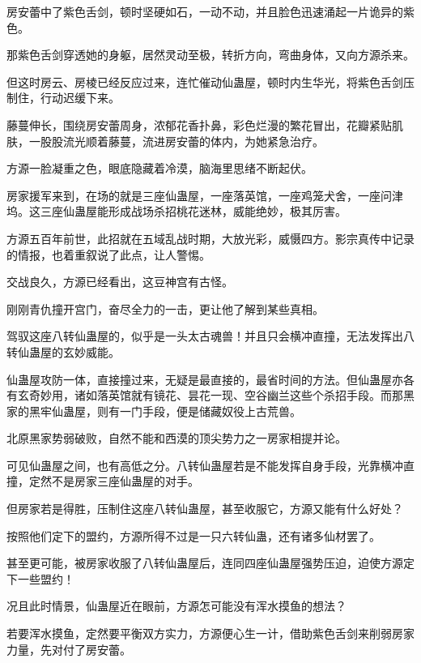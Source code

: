
\begin{this_body}



房安蕾中了紫色舌剑，顿时坚硬如石，一动不动，并且脸色迅速涌起一片诡异的紫色。

那紫色舌剑穿透她的身躯，居然灵动至极，转折方向，弯曲身体，又向方源杀来。

但这时房云、房棱已经反应过来，连忙催动仙蛊屋，顿时内生华光，将紫色舌剑压制住，行动迟缓下来。

藤蔓伸长，围绕房安蕾周身，浓郁花香扑鼻，彩色烂漫的繁花冒出，花瓣紧贴肌肤，一股股流光顺着藤蔓，流进房安蕾的体内，为她紧急治疗。

方源一脸凝重之色，眼底隐藏着冷漠，脑海里思绪不断起伏。

房家援军来到，在场的就是三座仙蛊屋，一座落英馆，一座鸡笼犬舍，一座问津坞。这三座仙蛊屋能形成战场杀招桃花迷林，威能绝妙，极其厉害。

方源五百年前世，此招就在五域乱战时期，大放光彩，威慑四方。影宗真传中记录的情报，也着重叙说了此点，让人警惕。

交战良久，方源已经看出，这豆神宫有古怪。

刚刚青仇撞开宫门，奋尽全力的一击，更让他了解到某些真相。

驾驭这座八转仙蛊屋的，似乎是一头太古魂兽！并且只会横冲直撞，无法发挥出八转仙蛊屋的玄妙威能。

仙蛊屋攻防一体，直接撞过来，无疑是最直接的，最省时间的方法。但仙蛊屋亦各有玄奇妙用，诸如落英馆就有镜花、昙花一现、空谷幽兰这些个杀招手段。而那黑家的黑牢仙蛊屋，则有一门手段，便是储藏奴役上古荒兽。

北原黑家势弱破败，自然不能和西漠的顶尖势力之一房家相提并论。

可见仙蛊屋之间，也有高低之分。八转仙蛊屋若是不能发挥自身手段，光靠横冲直撞，定然不是房家三座仙蛊屋的对手。

但房家若是得胜，压制住这座八转仙蛊屋，甚至收服它，方源又能有什么好处？

按照他们定下的盟约，方源所得不过是一只六转仙蛊，还有诸多仙材罢了。

甚至更可能，被房家收服了八转仙蛊屋后，连同四座仙蛊屋强势压迫，迫使方源定下一些盟约！

况且此时情景，仙蛊屋近在眼前，方源怎可能没有浑水摸鱼的想法？

若要浑水摸鱼，定然要平衡双方实力，方源便心生一计，借助紫色舌剑来削弱房家力量，先对付了房安蕾。


\end{this_body}
